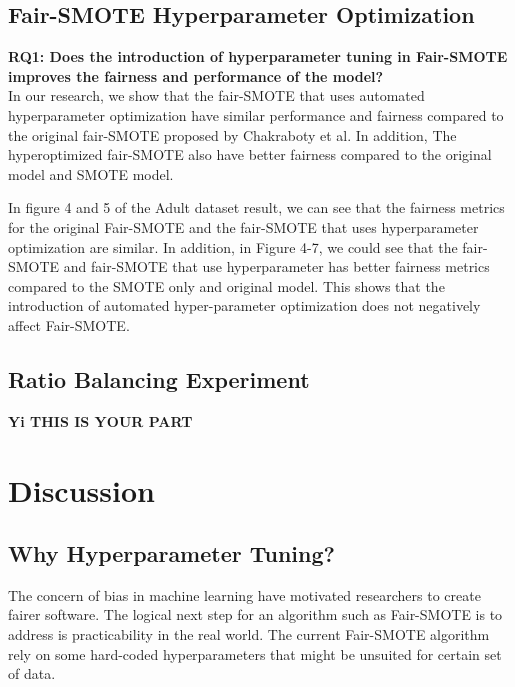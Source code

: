 \documentclass[sigconf]{acmart}
\begin{document}
\subsection{Fair-SMOTE Hyperparameter Optimization}
\textbf{RQ1: Does the introduction of hyperparameter tuning in Fair-SMOTE improves the fairness and performance of the model?}\\
In our research, we show that the fair-SMOTE that uses automated hyperparameter optimization have similar performance and fairness compared to the original fair-SMOTE proposed by Chakraboty et al. In addition, The hyperoptimized fair-SMOTE also have better fairness compared to the original model and SMOTE model.

In figure 4 and 5 of the Adult dataset result, we can see that the fairness metrics for the original Fair-SMOTE and the fair-SMOTE that uses hyperparameter optimization are similar. In addition, in Figure 4-7, we could see that the fair-SMOTE and fair-SMOTE that use hyperparameter has better fairness metrics compared to the SMOTE only and original model. This shows that the introduction of automated hyper-parameter optimization does not negatively affect Fair-SMOTE.

\subsection{Ratio Balancing Experiment}
\textbf{Yi THIS IS YOUR PART}

\section{Discussion}
\subsection{Why Hyperparameter Tuning?}
The concern of bias in machine learning have motivated researchers to create fairer software. The logical next step for an algorithm such as Fair-SMOTE is to address is practicability in the real world. The current Fair-SMOTE algorithm rely on some hard-coded hyperparameters that might be unsuited for certain set of data. 
\end{document}
